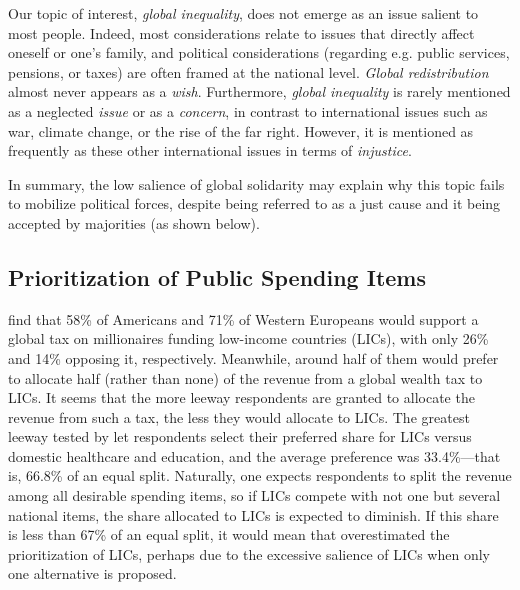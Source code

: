 \documentclass[12pt,english]{article}
\begin{document}
\begin{bibunit}
Our topic of interest, \textit{global inequality}, does not emerge as an issue salient to most people. Indeed, most considerations relate to issues that directly affect oneself or one's family, and political considerations (regarding e.g. public services, pensions, or taxes) are often framed at the national level. \textit{Global redistribution} almost never appears as a \textit{wish}. Furthermore, \textit{global inequality} is rarely mentioned as a neglected \textit{issue} or as a \textit{concern}, in contrast to international issues such as war, climate change, or the rise of the far right. However, it is mentioned as frequently as these other international issues in terms of \textit{injustice}.

In summary, the low salience of global solidarity may explain why this topic fails to mobilize political forces, despite being referred to as a just cause and it being accepted by majorities (as shown below).

\subsection{Prioritization of Public Spending Items}\label{subsec:revenue_split}

\cite{fabre_majority_2025} find that 58\% of Americans and 71\% of Western Europeans would support a global tax on millionaires funding low-income countries (LICs), with only 26\% and 14\% opposing it, respectively. Meanwhile, around half of them would prefer to allocate half (rather than none) of the revenue from a global wealth tax to LICs.
It seems that the more leeway respondents are granted to allocate the revenue from such a tax, the less they would allocate to LICs.
The greatest leeway tested by \cite{fabre_majority_2025} let respondents select their preferred share for LICs versus domestic healthcare and education, and the average preference was 33.4\%---that is, 66.8\% of an equal split.
Naturally, one expects respondents to split the revenue among all desirable spending items, so if LICs compete with not one but several national items, the share allocated to LICs is expected to diminish. If this share is less than 67\% of an equal split, it would mean that \cite{fabre_majority_2025} overestimated the prioritization of LICs, perhaps due to the excessive salience of LICs when only one alternative is proposed.


\end{bibunit}
\end{document}
